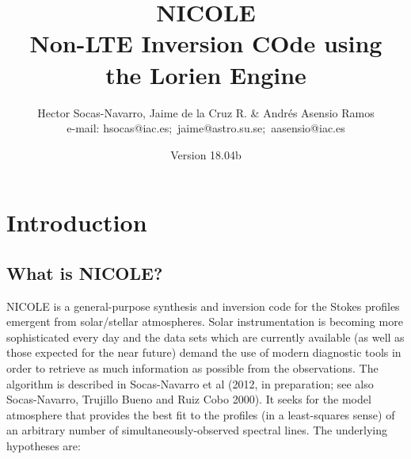 

\title{NICOLE \\
Non-LTE Inversion COde using \\
the Lorien Engine}

\author{Hector Socas-Navarro,
    Jaime de la Cruz R. \& Andr\'es Asensio Ramos \\
%
e-mail: \mbox{hsocas@iac.es; jaime@astro.su.se; aasensio@iac.es}\\
}

\date{Version 18.04b}

\maketitle


\tableofcontents



\chapter{Introduction}
\section{What is NICOLE?}

NICOLE is a general-purpose synthesis and inversion code for the
Stokes profiles emergent from solar/stellar atmospheres.  Solar
instrumentation is becoming more sophisticated every day and the data
sets which are currently available (as well as those expected for the
near future) demand the use of modern diagnostic tools in order to
retrieve as much information as possible from the observations.  The
algorithm is described in Socas-Navarro et al (2012, in preparation;
see also Socas-Navarro, Trujillo Bueno and Ruiz Cobo 2000). It seeks
for the model atmosphere that provides the best fit to the profiles
(in a least-squares sense) of an arbitrary number of
simultaneously-observed spectral lines.  The underlying hypotheses
are:


